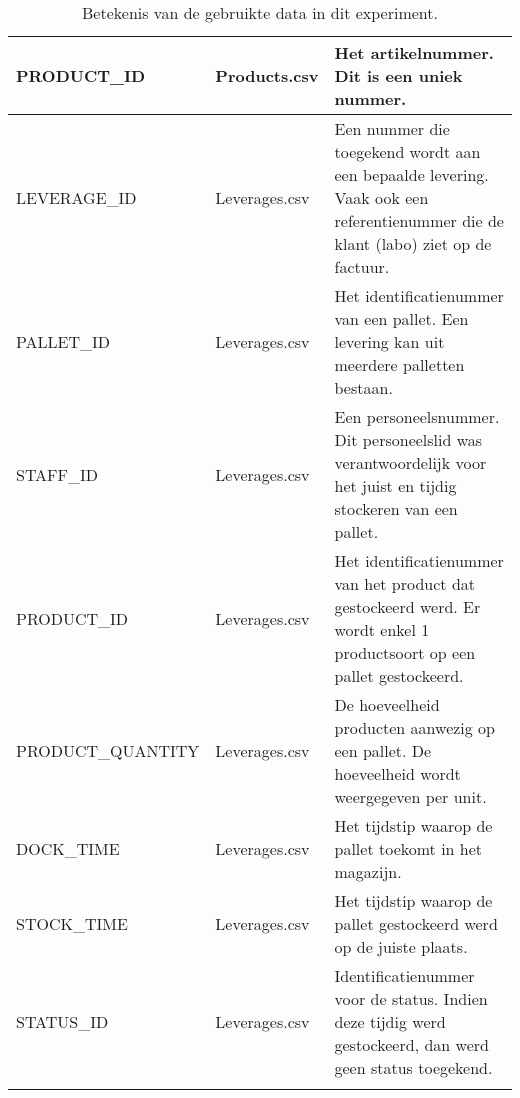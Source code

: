 \begin{center}
\begin{longtable}{  l  l  p{6cm} }
		PRODUCT\_ID & Products.csv & Het artikelnummer. Dit is een uniek nummer.  \\ \hline
		LEVERAGE\_ID & Leverages.csv & Een nummer die toegekend wordt aan een bepaalde levering.
		Vaak ook een referentienummer die de klant (labo) ziet op de factuur. \\ \hline
		PALLET\_ID & Leverages.csv & Het identificatienummer van een pallet.
		Een levering kan uit meerdere palletten bestaan. \\ \hline
		STAFF\_ID & Leverages.csv & Een personeelsnummer. 
		Dit personeelslid was verantwoordelijk voor het juist en tijdig stockeren van een pallet. \\ \hline
		PRODUCT\_ID & Leverages.csv & Het identificatienummer van het product dat gestockeerd werd.
		Er wordt enkel 1 productsoort op een pallet gestockeerd. \\ \hline
		PRODUCT\_QUANTITY & Leverages.csv & De hoeveelheid producten aanwezig op een pallet.
		De hoeveelheid wordt weergegeven per unit. \\ \hline
		DOCK\_TIME & Leverages.csv & Het tijdstip waarop de pallet toekomt in het magazijn. \\ \hline
		STOCK\_TIME & Leverages.csv & Het tijdstip waarop de pallet gestockeerd werd op de juiste plaats. \\ \hline
		STATUS\_ID & Leverages.csv & Identificatienummer voor de status. Indien deze tijdig werd gestockeerd, dan werd geen status toegekend. \\
	\caption{Betekenis van de gebruikte data in dit experiment.}
	\label{tab:betekenisdata}
	\end{longtable}
\end{center}